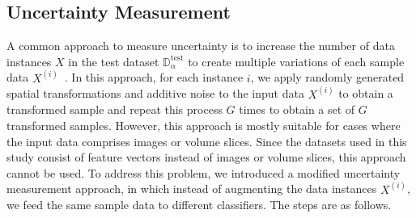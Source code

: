 \documentclass[default]{bst/sn-jnl_mine}%
\begin{document}
\subsection{Uncertainty Measurement}\label{subsec:crowd.uncertainty}
A common approach to measure uncertainty is to increase the number of data instances $X $ in the test dataset $\mathbb{D}_\alpha^{\mathrm{test}} $ to create multiple variations of each sample data $X^{(i)} $~\cite{ayhan_TestTime_2018}. In this approach, for each instance $i $, we apply randomly generated spatial transformations and additive noise to the input data $X^{(i)} $ to obtain a transformed sample and repeat this process $G $ times to obtain a set of $G $ transformed samples.
However, this approach is mostly suitable for cases where the input data comprises images or volume slices. Since the datasets used in this study consist of feature vectors instead of images or volume slices, this approach cannot be used. To address this problem, we introduced a modified uncertainty measurement approach, in which instead of augmenting the data instances $X^{(i)} $, we feed the same sample data to different classifiers.
The steps are as follows.
\end{document}
